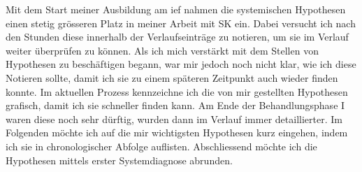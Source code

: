 Mit dem Start meiner Ausbildung am \ac{ief} nahmen die systemischen Hypothesen einen stetig grösseren Platz in meiner Arbeit mit SK ein. Dabei versucht ich nach den Stunden diese innerhalb der Verlaufseinträge zu notieren, um sie im Verlauf weiter überprüfen zu können. Als ich mich verstärkt mit dem Stellen von Hypothesen zu beschäftigen begann, war mir jedoch noch nicht klar, wie ich diese Notieren sollte, damit ich sie zu einem späteren Zeitpunkt auch wieder finden konnte. Im aktuellen Prozess kennzeichne ich die von mir gestellten Hypothesen grafisch, damit ich sie schneller finden kann. Am Ende der Behandlungsphase I waren diese noch sehr dürftig, wurden dann im Verlauf immer detaillierter. Im Folgenden möchte ich auf die mir wichtigsten Hypothesen kurz eingehen, indem ich sie in chronologischer Abfolge auflisten. Abschliessend möchte ich die Hypothesen mittels erster Systemdiagnose abrunden.
